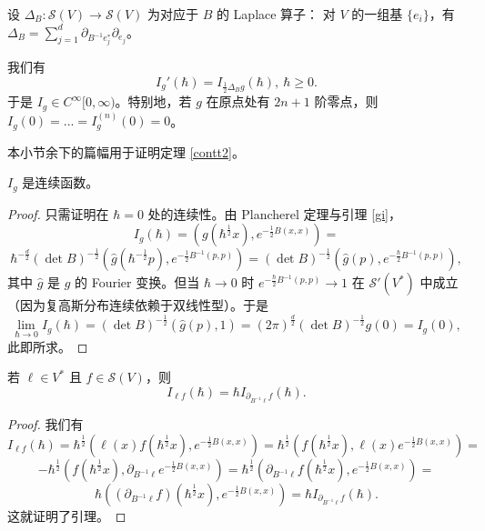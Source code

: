 设 $\Delta_B: \mathcal S(V)\to \mathcal S(V)$ 为对应于 $B$ 的 Laplace 算子：
对 $V$ 的一组基 $\lbrace e_i\rbrace$，有 $\Delta_B=\sum_{j=1}^d \partial_{B^{-1}e_j^*}\partial_{e_j}$。

\begin{theorem} \label{contt2}
我们有
$$
I_g'(\hbar)=I_{\tfrac{1}{2}\Delta_B g}(\hbar),\ \hbar\ge 0.
$$
于是 $I_g\in C^\infty[0,\infty)$。特别地，若 $g$ 在原点处有 $2n+1$ 阶零点，则 $I_g(0)=...=I_g^{(n)}(0)=0$。
\end{theorem} 



本小节余下的篇幅用于证明定理 \ref{contt2}。

\begin{lemma}\label{contt} $I_g$ 是连续函数。
\end{lemma} 

\begin{proof} 只需证明在 $\hbar=0$ 处的连续性。由 Plancherel 定理与引理 \ref{gi}，
$$
I_g(\hbar)=(g(\hbar^{\frac{1}{2}} x),e^{-\frac{1}{2}B(x,x)})=
$$
$$
\hbar^{-\frac{d}{2}}(\det B)^{-\frac{1}{2}}(\widehat g(\hbar^{-\frac{1}{2}}p), e^{-\frac{1}{2}B^{-1}(p,p)})=(\det B)^{-\frac{1}{2}}(\widehat g(p), e^{-\frac{\hbar}{2}B^{-1}(p,p)}),
$$
其中 $\widehat g$ 是 $g$ 的 Fourier 变换。但当 $\hbar\to 0$ 时 $e^{-\frac{\hbar}{2}B^{-1}(p,p)}\to 1$ 在
$\mathcal S'(V^*)$ 中成立（因为复高斯分布连续依赖于双线性型）。于是
$$
\lim_{\hbar\to 0}I_g(\hbar)=(\det B)^{-\frac{1}{2}}(\widehat g(p),1)=
(2\pi)^{\frac{d}{2}}(\det B)^{-\frac{1}{2}}g(0)=I_g(0),
$$
此即所求。
\end{proof} 

\begin{lemma}\label{contt1} 若 $\ell\in V^*$ 且 $f\in \mathcal S(V)$，则
$$
I_{\ell f}(\hbar)=\hbar I_{\partial_{B^{-1}\ell}f}(\hbar).
$$
\end{lemma}

\begin{proof}  
我们有
$$
I_{\ell f}(\hbar)=
\hbar^{\frac{1}{2}}(\ell(x)f(\hbar^{\frac{1}{2}}x),e^{-\frac{1}{2}B(x,x)})=
\hbar^{\frac{1}{2}}(f(\hbar^{\frac{1}{2}}x),\ell(x)e^{-\frac{1}{2}B(x,x)})=
$$
$$
-\hbar^{\frac{1}{2}}(f(\hbar^{\frac{1}{2}}x),\partial_{B^{-1}\ell}e^{-\frac{1}{2}B(x,x)})=
\hbar^{\frac{1}{2}}(\partial_{B^{-1}\ell}f(\hbar^{\frac{1}{2}}x),e^{-\frac{1}{2}B(x,x)})=
$$
$$
\hbar ((\partial_{B^{-1}\ell}f)(\hbar^{\frac{1}{2}}x),e^{-\frac{1}{2}B(x,x)})=\hbar I_{\partial_{B^{-1}\ell}f}(\hbar).
$$
这就证明了引理。
\end{proof} 

